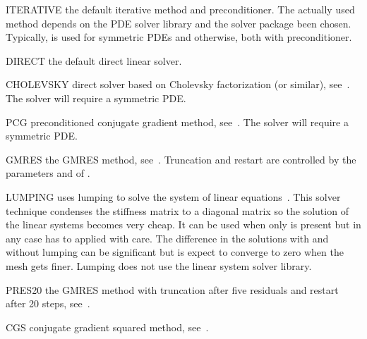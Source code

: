 \begin{memberdesc}[LinearPDE]{ITERATIVE}
the default iterative method and preconditioner. The actually used method depends on the
PDE solver library and the solver package been chosen. Typically, \PCG is used for symmetric PDEs
and \BiCGStab otherwise, both with \JACOBI preconditioner.
\end{memberdesc}

\begin{memberdesc}[LinearPDE]{DIRECT}
the default direct linear solver.
\end{memberdesc}

\begin{memberdesc}[LinearPDE]{CHOLEVSKY}
direct solver based on Cholevsky factorization (or similar), see~. The solver will require a symmetric PDE.
\end{memberdesc}

\begin{memberdesc}[LinearPDE]{PCG}
preconditioned conjugate gradient method, see~. The solver will require a symmetric PDE.
\end{memberdesc}

\begin{memberdesc}[LinearPDE]{GMRES}
the GMRES method, see~. Truncation and restart are controlled by the parameters
 and  of .
\end{memberdesc}

\begin{memberdesc}[LinearPDE]{LUMPING}
uses lumping to solve the system of linear equations~. This solver technique
condenses the stiffness matrix to a diagonal matrix so the solution of the linear systems becomes very cheap. It can be used when
only  is present but in any case has to applied with care. The difference in the solutions with and without lumping can be significant
but is expect to converge to zero when the mesh gets finer.
Lumping does not use the linear system solver library.
\end{memberdesc}

\begin{memberdesc}[LinearPDE]{PRES20}
the GMRES method with truncation after five residuals and
restart after 20 steps, see~.
\end{memberdesc}

\begin{memberdesc}[LinearPDE]{CGS}
conjugate gradient squared method, see~.
\end{memberdesc}

